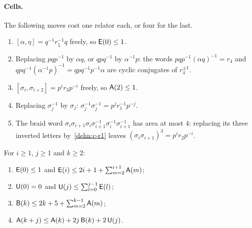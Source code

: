 \paragraph{Cells.} The following moves cost one relator each, or four for the last.
\begin{enumerate}[label=(c\arabic*),itemsep=1pt]
\item\label{dehn:c-eta} $[\alpha,\eta]=q^{-1}r_5^{-1}q$ freely, so $\mathsf E(0)\le1$.
\item\label{dehn:c-r4} Replacing $pqp^{-1}$ by $\alpha q$, or $qpq^{-1}$ by $\alpha^{-1}p$: the words $pqp^{-1}(\alpha q)^{-1}=r_4$ and
$qpq^{-1}(\alpha^{-1}p)^{-1}=qpq^{-1}p^{-1}\alpha$ are cyclic conjugates of $r_4^{\pm1}$.
\item\label{dehn:c-r3} $[\sigma_i,\sigma_{i+2}]=p^ir_3p^{-i}$ freely, so $\mathsf A(2)\le1$.
\item\label{dehn:c-r1} Replacing $\sigma_j^{-1}$ by $\sigma_j$: $\sigma_j^{-1}\sigma_j^{-1}=p^jr_1^{-1}p^{-j}$.
\item\label{dehn:c-braid} The braid word $\sigma_i\sigma_{i+1}\sigma_i\sigma_{i+1}^{-1}\sigma_i^{-1}\sigma_{i+1}^{-1}$ has area at most $4$:
replacing its three inverted letters by~\ref{dehn:c-r1} leaves $(\sigma_i\sigma_{i+1})^3=p^ir_2p^{-i}$.
\end{enumerate}

\begin{lemma}\label{lem:transfer-dehn}
For $i\ge1$, $j\ge1$ and $k\ge2$:
\begin{enumerate}[label=(\roman*),itemsep=1pt]
\item $\mathsf E(0)\le1$ and $\mathsf E(i)\le2i+1+\sum_{m=2}^{i+1}\mathsf A(m)$;
\item $\mathsf U(0)=0$ and $\mathsf U(j)\le\sum_{l=0}^{j-1}\mathsf E(l)$;
\item $\mathsf B(k)\le2k+5+\sum_{m=2}^{k-1}\mathsf A(m)$;
\item $\mathsf A(k+j)\le\mathsf A(k)+2j\,\mathsf B(k)+2\,\mathsf U(j)$.
\end{enumerate}
\end{lemma}

